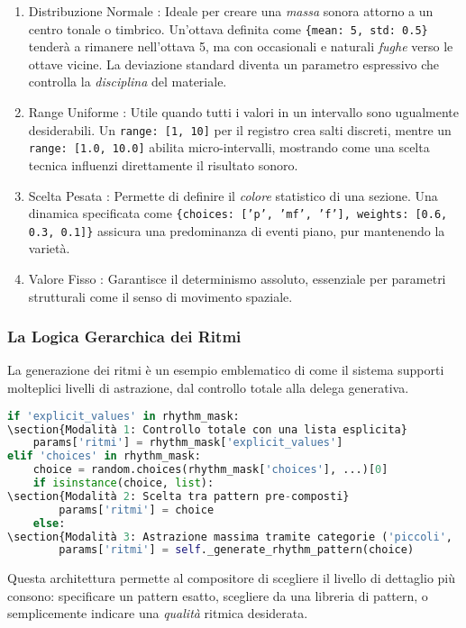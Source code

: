 \begin{enumerate}
    \item Distribuzione Normale : Ideale per creare una \textit{massa} sonora attorno a un centro tonale o timbrico. Un'ottava definita come \texttt{\{mean: 5, std: 0.5\}} tenderà a rimanere nell'ottava 5, ma con occasionali e naturali \textit{fughe} verso le ottave vicine. La deviazione standard diventa un parametro espressivo che controlla la \textit{disciplina} del materiale.
    \item Range Uniforme : Utile quando tutti i valori in un intervallo sono ugualmente desiderabili. Un \texttt{range: [1, 10]} per il registro crea salti discreti, mentre un \texttt{range: [1.0, 10.0]} abilita micro-intervalli, mostrando come una scelta tecnica influenzi direttamente il risultato sonoro.
    \item Scelta Pesata : Permette di definire il \textit{colore} statistico di una sezione. Una dinamica specificata come \texttt{\{choices: ['p', 'mf', 'f'], weights: [0.6, 0.3, 0.1]\}} assicura una predominanza di eventi piano, pur mantenendo la varietà.
    \item Valore Fisso : Garantisce il determinismo assoluto, essenziale per parametri strutturali come il senso di movimento spaziale.
\end{enumerate}
\subsubsection{La Logica Gerarchica dei Ritmi}
La generazione dei ritmi è un esempio emblematico di come il sistema supporti molteplici livelli di astrazione, dal controllo totale alla delega generativa.

\begin{lstlisting}[language=Python]
if 'explicit_values' in rhythm_mask:
\section{Modalità 1: Controllo totale con una lista esplicita}
    params['ritmi'] = rhythm_mask['explicit_values']
elif 'choices' in rhythm_mask:
    choice = random.choices(rhythm_mask['choices'], ...)[0]
    if isinstance(choice, list):
\section{Modalità 2: Scelta tra pattern pre-composti}
        params['ritmi'] = choice
    else:
\section{Modalità 3: Astrazione massima tramite categorie ('piccoli', 'medi'...)}
        params['ritmi'] = self._generate_rhythm_pattern(choice)
\end{lstlisting}
Questa architettura permette al compositore di scegliere il livello di dettaglio più consono: specificare un pattern esatto, scegliere da una libreria di pattern, o semplicemente indicare una \textit{qualità} ritmica desiderata.

